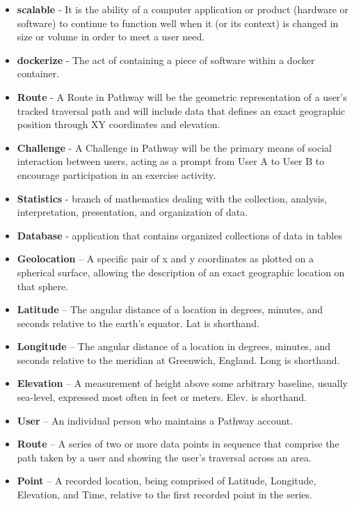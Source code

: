 ﻿\documentclass{article}
\begin{document}
\begin{itemize}
    \item \textbf{scalable} - It is the ability of a computer application or product (hardware or software) to continue to function well when it (or its context) is changed in size or volume in order to meet a user need.
    \item \textbf{dockerize} - The act of containing a piece of software within a docker container.
    \item \textbf{Route} - A Route in Pathway will be the geometric representation of a user’s tracked traversal path and will include data that defines an exact geographic position through XY coordinates and elevation.
    \item \textbf{Challenge} - A Challenge in Pathway will be the primary means of social interaction between users, acting as a prompt from User A to User B to encourage participation in an exercise activity.
    \item \textbf{Statistics} - branch of mathematics dealing with the collection, analysis, interpretation, presentation, and organization of data.
    \item \textbf{Database} - application that contains organized collections of data in tables
    \item \textbf{Geolocation} – A specific pair of x and y coordinates as plotted on a spherical surface, allowing the description of an exact geographic location on that sphere.
    \item \textbf{Latitude} – The angular distance of a location in degrees, minutes, and seconds relative to the earth’s equator. Lat is shorthand.
    \item \textbf{Longitude} – The angular distance of a location in degrees, minutes, and seconds relative to the meridian at Greenwich, England. Long is shorthand.
    \item \textbf{Elevation} – A measurement of height above some arbitrary baseline, usually sea-level, expressed most often in feet or meters. Elev. is shorthand.
    \item \textbf{User} – An individual person who maintains a Pathway account.
    \item \textbf{Route} – A series of two or more data points in sequence that comprise the path taken by a user and showing the user’s traversal across an area.
    \item \textbf{Point} – A recorded location, being comprised of Latitude, Longitude, Elevation, and Time, relative to the first recorded point in the series.
\end{itemize}
\end{document}
